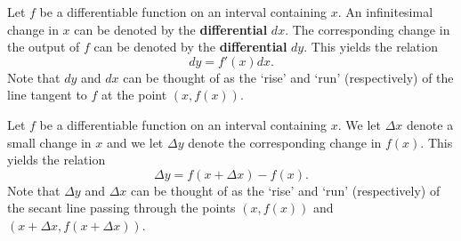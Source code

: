 \documentclass[answers]{exam}
\begin{document}
%  
%    

\begin{defn*}[Differentials]
    Let $f$ be a differentiable function on an interval containing $x$. An infinitesimal change in $x$ can be denoted by the \textbf{differential} $dx$. The corresponding change in the output of $f$ can be denoted by the \textbf{differential} $dy$. This yields the relation
        $$dy = f'(x)dx.$$
    Note that $dy$ and $dx$ can be thought of as the `rise' and `run' (respectively) of the line tangent to $f$ at the point $(x,f(x))$.
\end{defn*}

\begin{defn*}
    Let $f$ be a differentiable function on an interval containing $x$. We let $\Delta x$ denote a small change in $x$ and we let $\Delta y$ denote the corresponding change in $f(x)$. This yields the relation
        $$\Delta y = f(x+\Delta x) - f(x).$$
    Note that $\Delta y$ and $\Delta x$ can be thought of as the `rise' and `run' (respectively) of the secant line passing through the points $(x,f(x))$ and $(x+\Delta x, f(x+\Delta x))$.
\end{defn*}

\noindent
{}
\pagebreak
\end{document}

